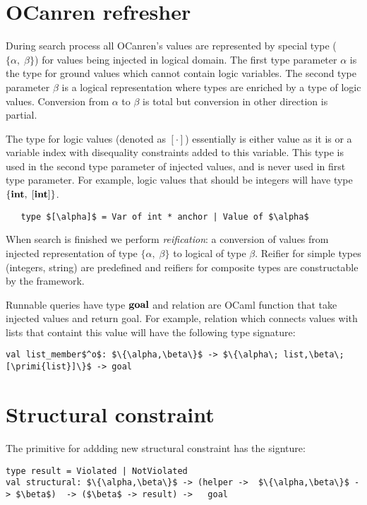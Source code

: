 \section{OCanren refresher}

During search process all OCanren's values are represented by special type ($\{\alpha,\;\beta\}$) for values being injected in logical domain. The first type parameter $\alpha$ is the type for ground values which cannot contain logic variables. The second type parameter $\beta$ is a logical representation where types are enriched by a type of logic values. Conversion from $\alpha$ to $\beta$ is total but conversion in other direction is partial.

The type for logic values (denoted as $[\cdot]$) essentially is either value as it is or a variable index with disequality constraints added to this variable. This type is used in the second type parameter of injected values, and is never used in first type parameter. For example, logic values that should be integers will have type $\{\mathbf{int},\;[\mathbf{int}] \}$.

\begin{lstlisting}
   type $[\alpha]$ = Var of int * anchor | Value of $\alpha$
\end{lstlisting}

When search is finished we perform \emph{reification}: a conversion of values from injected representation of type $\{\alpha,\;\beta\}$ to logical of type $\beta$. Reifier for simple types (integers, string) are predefined and reifiers for composite types are constructable by the framework.

Runnable queries have type $\mathbf{goal}$ and relation are OCaml function that take injected values and return goal. For example, relation which connects values with lists that containt this value will have the following type signature:

\begin{lstlisting}
val list_member$^o$: $\{\alpha,\beta\}$ -> $\{\alpha\; list,\beta\; [\primi{list}]\}$ -> goal
\end{lstlisting}

\section{Structural constraint}

The primitive for addding new structural constraint has the signture:

\begin{lstlisting}
type result = Violated | NotViolated
val structural: $\{\alpha,\beta\}$ -> (helper ->  $\{\alpha,\beta\}$ -> $\beta$)  -> ($\beta$ -> result) ->   goal
\end{lstlisting}

